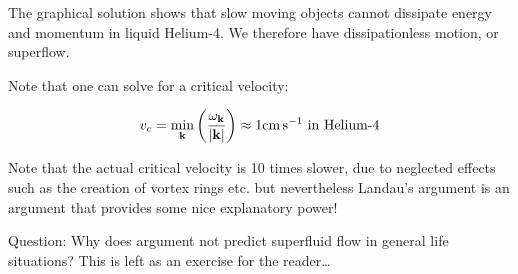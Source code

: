 The graphical solution shows that slow moving objects cannot dissipate energy and momentum in liquid Helium-4. We therefore have dissipationless motion, or superflow.

Note that one can solve for a critical velocity:

\begin{equation}
    v_c = \min_\v{k}\left(\frac{\omega_\v{k}}{\abs{\v{k}}}\right) \approx 1\si{cm.s^{-1}} \text{ in Helium-4}
\end{equation}

Note that the actual critical velocity is 10 times slower, due to neglected effects such as the creation of vortex rings etc. but nevertheless Landau's argument is an argument that provides some nice explanatory power!

Question: Why does argument not predict superfluid flow in general life situations? This is left as an exercise for the reader\dots

